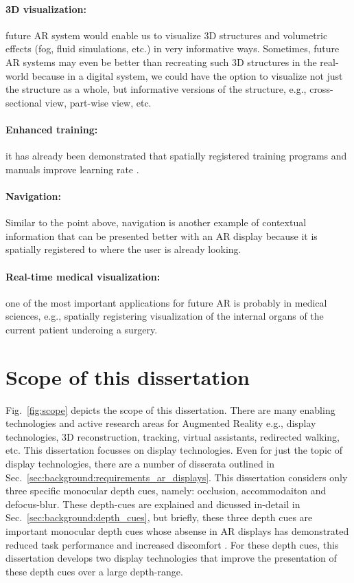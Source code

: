 \paragraph{3D visualization:} future AR system would enable us to visualize 3D structures and volumetric effects (fog, fluid simulations, etc.) in very informative ways. 
Sometimes, future AR systems may even be better than recreating such 3D structures in the real-world because in a digital system, we could have the option to visualize not just the structure as a whole, but informative versions of the structure, e.g., cross-sectional view, part-wise view, etc. 
\paragraph{Enhanced training:} it has already been demonstrated that spatially registered training programs and manuals improve learning rate . 
\paragraph{Navigation:} Similar to the point above, navigation is another example of contextual information that can be presented better with an AR display because it is spatially registered to where the user is already looking.
\paragraph{Real-time medical visualization:} one of the most important applications for future AR is probably in medical sciences, e.g., spatially registering visualization of the internal organs of the current patient underoing a surgery.

\section{Scope of this dissertation}

Fig.~\ref{fig:scope} depicts the scope of this dissertation. 
There are many enabling technologies and active research areas for Augmented Reality e.g., display technologies, 3D reconstruction, tracking, virtual assistants, redirected walking, etc. 
This dissertation focusses on display technologies. 
Even for just the topic of display technologies, there are a number of disserata outlined in Sec.~\ref{sec:background:requirements_ar_displays}. 
This dissertation considers only three specific monocular depth cues, namely: occlusion, accommodaiton and defocus-blur. 
These depth-cues are explained and dicussed in-detail in Sec.~\ref{sec:background:depth_cues}, but briefly, these three depth cues are important monocular depth cues whose absense in AR displays has demonstrated reduced task performance  and increased discomfort . 
For these depth cues, this dissertation develops two display technologies that improve the presentation of these depth cues over a large depth-range.

